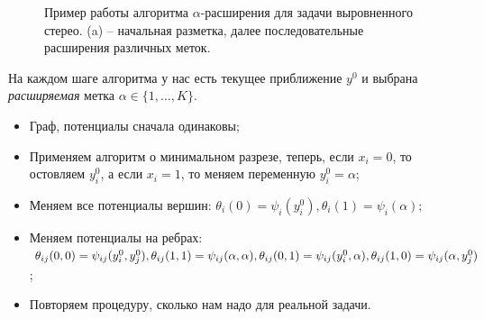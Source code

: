\documentclass[a4paper, 12pt]{article}
\begin{document}
\begin{figure}[H]
  \caption{Пример работы алгоритма $\alpha$-расширения для задачи
  выровненного стерео. (a) -- начальная разметка, далее последовательные
  расширения различных меток.}
\end{figure}

На каждом шаге алгоритма у нас есть текущее приближение $y^0$ и выбрана
\textit{расширяемая} метка $\alpha \in \{1, \ldots, K\}$.

\begin{itemize}
  \item Граф, потенциалы сначала одинаковы;
  \item Применяем алгоритм о минимальном разрезе, теперь, если $x_i = 0$, то
  остовляем $y_i^0$, а если $x_i = 1$, то меняем переменную $y_i^0 = \alpha$;
  \item Меняем все потенциалы вершин: $\theta_i(0) = \psi_i(y_i^0), 
  \theta_i(1) = \psi_i(\alpha);$
  \item Меняем потенциалы на ребрах: $\theta_{ij}(0, 0) = \psi_{ij}(y_i^0, y_j^0),
  \theta_{ij}(1, 1) = \psi_{ij}(\alpha, \alpha), \theta_{ij}(0, 1) =
  \psi_{ij}(y_i^0, \alpha), \\\theta_{ij}(1, 0) = \psi_{ij}(\alpha, y_j^0)$;
  \item Повторяем процедуру, сколько нам надо для реальной задачи.
\end{itemize}
\end{document}
